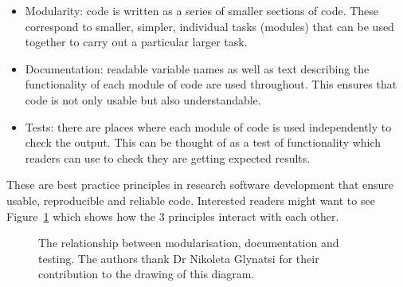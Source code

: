 \begin{itemize}
        \item Modularity: code is written as a
              series of smaller sections of code. These correspond to smaller,
              simpler, individual tasks (modules) that can be used together to carry out
              a particular larger task.
        \item Documentation: readable variable names as
              well as
              text describing the functionality of each module of code are used
              throughout. This ensures that code is not only usable but also
              understandable.
          \item Tests: there are places where each module of code is
              used independently to check the output. This can be thought of as a
              test of functionality which readers can use to check they are
              getting expected results.
\end{itemize}

These are best practice principles in research software development
that ensure usable, reproducible and reliable code\autocite{wilson2014best}.
Interested readers might want to see Figure~\ref{fig:rsd-triangle} which shows
how the 3 principles interact with each other.

\begin{figure}
    \begin{center}
        
        \caption{The relationship between modularisation, documentation and
            testing. The authors thank Dr Nikoleta Glynatsi for their contribution to
            the drawing of this diagram.}  %
        \label{fig:rsd-triangle}
    \end{center}
\end{figure}
